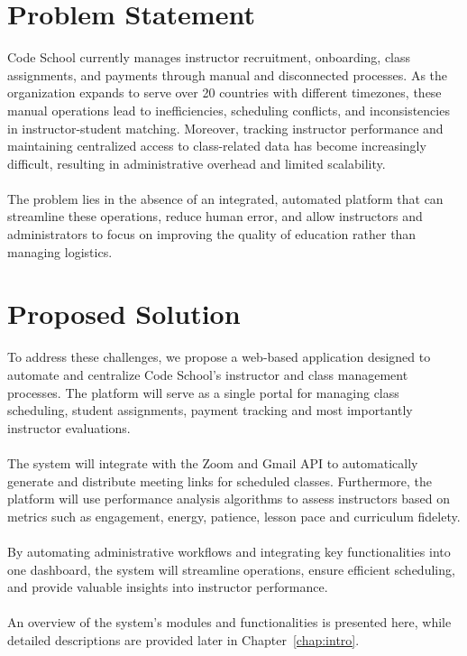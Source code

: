 \section{Problem Statement}

Code School currently manages instructor recruitment, onboarding, class assignments, and payments through manual and disconnected processes. As the organization expands to serve over 20 countries with different timezones, these manual operations lead to inefficiencies, scheduling conflicts, and inconsistencies in instructor-student matching. Moreover, tracking instructor performance and maintaining centralized access to class-related data has become increasingly difficult, resulting in administrative overhead and limited scalability.
\\
\\
\indent The problem lies in the absence of an integrated, automated platform that can streamline these operations, reduce human error, and allow instructors and administrators to focus on improving the quality of education rather than managing logistics.

\section{Proposed Solution}

To address these challenges, we propose a web-based application designed to automate and centralize Code School's instructor and class management processes. The platform will serve as a single portal for managing class scheduling, student assignments, payment tracking and most importantly instructor evaluations.
\\
\\
\indent The system will 
integrate with the Zoom and Gmail API to automatically generate and distribute meeting links for scheduled classes. Furthermore, the platform will use performance analysis algorithms to assess instructors based on metrics such as engagement, energy, patience, lesson pace and curriculum fidelety.
\\
\\
\indent By automating administrative workflows and integrating key functionalities into one dashboard, the system will streamline operations, ensure efficient scheduling, and provide valuable insights into instructor performance.
\\
\\
\indent An overview of the system's modules and functionalities is presented here, while detailed descriptions are provided later in Chapter~\ref{chap:intro}.

